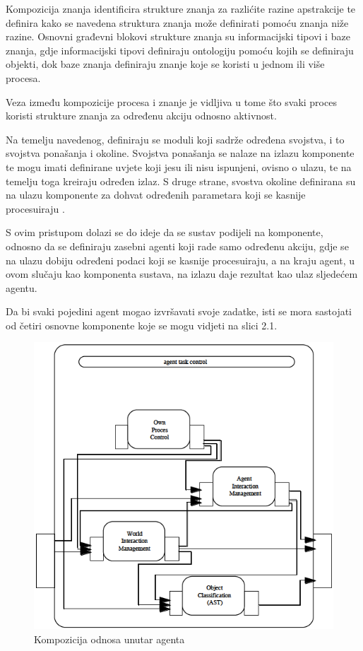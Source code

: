 \documentclass[a4paper,12pt]{foi}
\begin{document}
Kompozicija znanja identificira strukture znanja za razlićite razine apstrakcije te definira kako se navedena struktura znanja može definirati pomoću znanja niže razine. Osnovni građevni blokovi strukture znanja su informacijski tipovi i baze znanja, gdje informacijski tipovi definiraju ontologiju pomoću kojih se definiraju objekti, dok baze znanja definiraju znanje koje se koristi u jednom ili više procesa.

Veza između kompozicije procesa i znanje je vidljiva u tome što svaki proces koristi strukture znanja za određenu akciju odnosno aktivnost.

Na temelju navedenog, definiraju se moduli koji sadrže određena svojstva, i to svojstva ponašanja i okoline. Svojstva ponašanja se nalaze na izlazu komponente	 te mogu imati definirane uvjete koji jesu ili nisu ispunjeni, ovisno o ulazu, te na temelju toga kreiraju određen izlaz. S druge strane, svostva okoline definirana su na ulazu komponente za dohvat određenih parametara koji se kasnije procesuiraju \citep{JonkerTreur2002}.	

S ovim pristupom dolazi se do ideje da se sustav podijeli na komponente, odnosno da se definiraju zasebni agenti koji rade samo određenu akciju, gdje se na ulazu dobiju određeni podaci koji se kasnije procesuiraju, a na kraju agent, u ovom slučaju kao komponenta sustava, na izlazu daje rezultat kao ulaz sljedećem agentu.


Da bi svaki pojedini agent mogao izvršavati svoje zadatke, isti se mora sastojati od četiri osnovne komponente koje se mogu vidjeti na slici 2.1.

\begin{figure}[h]
\centering
\includegraphics[width=\linewidth]{00-composition-relation}
	\caption{Kompozicija odnosa unutar agenta \citep{JonkerTreur2002}}
\end{figure}
\end{document}
